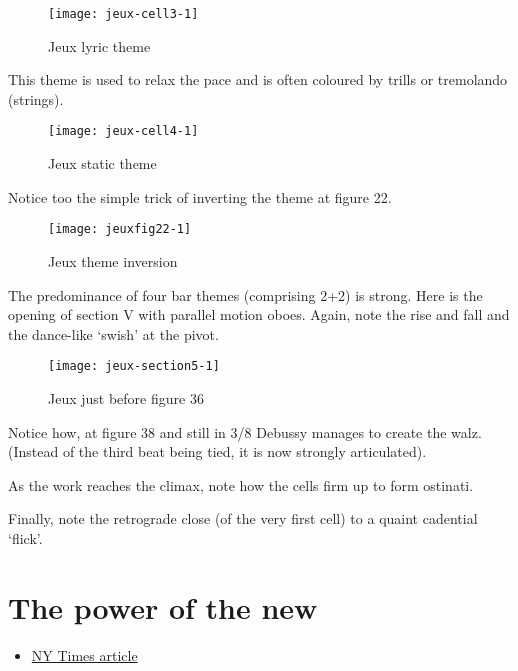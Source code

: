 \begin{figure}[H]
\centering
\texttt{[image: jeux-cell3-1]}\caption{Jeux lyric theme}
\label{fig:jeux3}
\end{figure}

This theme is used to relax the pace and is often coloured by trills or tremolando (strings).

\begin{figure}[H]
\centering
\texttt{[image: jeux-cell4-1]}\caption{Jeux static theme}
\label{fig:jeux4}
\end{figure}

Notice too the simple trick of inverting the theme at figure 22. 

\begin{figure}[H]
\centering
\texttt{[image: jeuxfig22-1]}\caption{Jeux theme inversion}
\label{fig:jeuxthemeinvert}
\end{figure}

The predominance of four bar themes (comprising 2+2) is strong. Here is the opening of section V with parallel motion oboes. Again, note the rise and fall and the dance-like `swish' at the pivot. 

\begin{figure}[H]
\centering
\texttt{[image: jeux-section5-1]}\caption{Jeux just before figure 36}
\label{fig:jeuxoboe}
\end{figure}

Notice how, at figure 38 and still in 3/8 Debussy manages to create the walz. (Instead of the third beat being tied, it is now strongly articulated).    

As the work reaches the climax, note how the cells firm up to form ostinati. 

Finally, note the retrograde close (of the very first cell) to a quaint cadential `flick'. 


\section{The power of the new}
\begin{itemize}
\item \href{http://www.nytimes.com/2012/09/19/arts/music/radical-music-sometimes-shocking-sometimes-subtle.html?pagewanted=all&_r=0}{NY Times article}
\end{itemize}


